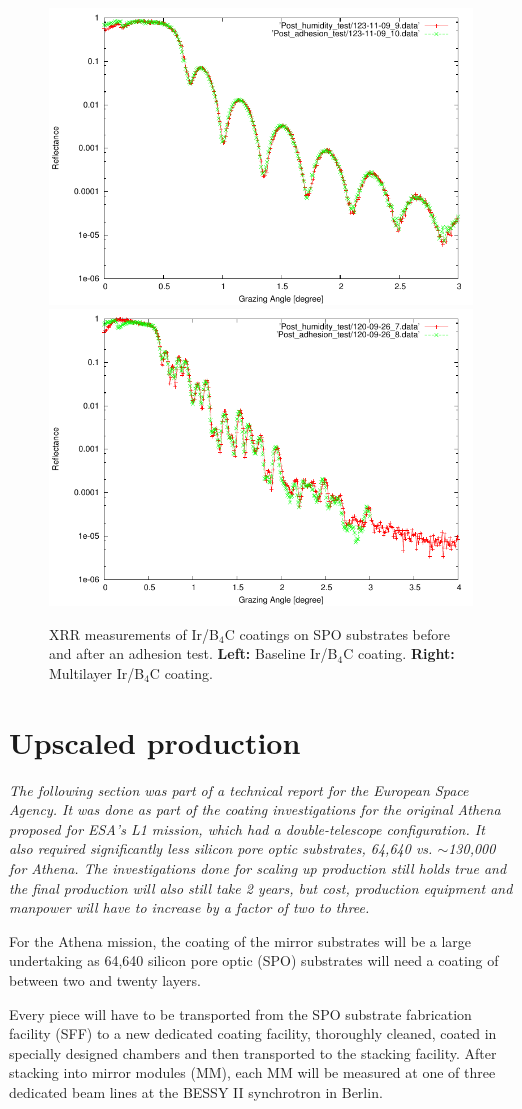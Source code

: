 \begin{figure}[!h]
  \center  \includegraphics[width=0.47\linewidth]{figures/athena/coating_on_spo/123-11-09_Adhesion_test.pdf}
  \includegraphics[width=0.47\linewidth]{figures/athena/coating_on_spo/120-09-26_Adhesion_test.pdf}
\caption{\footnotesize XRR measurements of Ir/B$_4$C coatings on SPO substrates before and after an adhesion test. \textbf{Left:} Baseline Ir/B$_4$C coating. \textbf{Right:} Multilayer Ir/B$_4$C coating.}\label{fig:qa_adh}
\end{figure}


\section{Upscaled production}\label{sec:Athena_upscaled}

\emph{The following section was part of a technical report for the European Space Agency. It was done as part of the coating investigations for the original Athena proposed for ESA's L1 mission, which had a double-telescope configuration. It also required significantly less silicon pore optic substrates, 64,640 vs. $\sim$130,000 for Athena. The investigations done for scaling up production still holds true and the final production will also still take 2 years, but cost, production equipment and manpower will have to increase by a factor of two to three.}

For the Athena mission, the coating of the mirror substrates will be a large undertaking as 64,640 silicon pore optic (SPO) substrates will need a coating of between two and twenty layers.

Every piece will have to be transported from the SPO substrate fabrication facility (SFF) to a new dedicated coating facility, thoroughly cleaned, coated in specially designed chambers and then transported to the stacking facility. After stacking into mirror modules (MM), each MM will be measured at one of three dedicated beam lines at the BESSY II synchrotron in Berlin.


